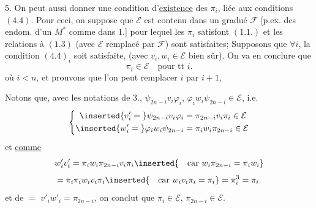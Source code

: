 5. On peut aussi donner une condition d'\uline{existence} des $\pi_i$, liée aux conditions $(4.4)$. Pour ceci, on suppose que $\mathcal E$ est contenu dans un  gradué $\mathcal F$ [p.ex.  des endom. d'un $M^*$ comme dans 1.] pour lequel les $\pi_i$ satisfont $(1.1.)$ et les relations  à $(1.3)$ (avec $\mathcal E$ remplacé par $\mathcal F$) sont satisfaites;  Supposons que $\forall i$, la condition $(4.4)_i$ soit satisfaite, (avec $v_i,w_i\in\mathcal E$ bien sûr). On va en conclure que
\[
\pi_i\in\mathcal E\quad\text{pour tt }i.
\tag{5.1}
\]
 où $i<n$, et prouvons que l'on peut remplacer $i$ par $i+1$, 

Notons que, avec les notations de 3.,    $\psi_{2n-i}v_i\varphi_i$, $\varphi_iw_i\psi_{2n-i}\in\mathcal E$, i.e.
\[
\left\{\begin{aligned}
\inserted{v'_i={}}\psi_{2n-i}v_i\varphi_i&=\pi_{2n-i}v_i\pi_i\in\mathcal E\\
\inserted{w'_i={}}\varphi_iw_i\psi_{2n-i}&=\pi_iw_i\pi_{2n-i}\in\mathcal E
\end{aligned}\right.
\]
et \uline{comme} 
\[
w'_iv'_i=\pi_iw_i\pi_{2n-i}v_i\pi_i
\inserted{\quad\text{car }w_i\pi_{2n-i}=\pi_iw_i}\]
\[
=\pi_i\pi_iw_iv_i\pi_i
\inserted{\quad\text{car }w_iv_i\pi_i=\pi_i}
=\pi_i^3=\pi_i.
\]
et de $=$  $v'_iw'_i=\pi_{2n-i}$, on conclut que $\pi_i\in\mathcal E$, $\pi_{2n-i}\in\mathcal E$.
